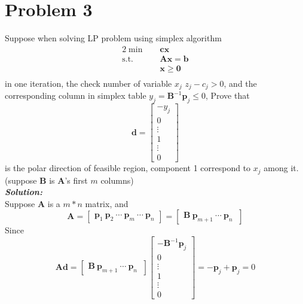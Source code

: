 \documentclass[paper=a4, fontsize=11pt]{scrartcl} %
\numberwithin{equation}{section} %
\numberwithin{figure}{section} %
\numberwithin{table}{section} %
\begin{document}
\section{Problem 3}
Suppose when solving LP problem using simplex algorithm
\begin{alignat}{2}  \nonumber
\min\quad & \mathbf{cx}\\    \nonumber
\mbox{s.t.}\quad   \nonumber
& \mathbf{Ax=b}\\           \nonumber
& \mathbf{x}\geq \mathbf{0}\\         \nonumber
\end{alignat}
in one iteration, the check number of variable $x_j$ $z_j-c_j>0$, and the corresponding column in simplex table $y_j=\mathbf{B}^{-1}\mathbf{p}_j\leq0$, Prove that
\begin{equation}  \nonumber
\mathbf{d} = \begin{bmatrix}
    -y_j \\  0 \\ \vdots \\ 1 \\ \vdots \\ 0
    \end{bmatrix}
\end{equation}
is  the polar direction of feasible region, component 1 correspond to $x_j$ among it. (suppose $\mathbf{B}$ is $\mathbf{A}$'s first $m$ columns)\\
\emph{\textbf{Solution:}}\\
Suppose $\mathbf{A}$ is a $m*n$ matrix, and
\begin{equation}  \nonumber
\mathbf{A} = \begin{bmatrix}\mathbf{p}_1 \ \mathbf{p}_2 \ \cdots \ \mathbf{p}_m \ \cdots \ \mathbf{p}_n \end{bmatrix}
= \begin{bmatrix}\mathbf{B}\ \mathbf{p}_{m+1} \ \cdots \ \mathbf{p}_n \ \end{bmatrix}
\end{equation}
Since
\begin{equation}  \nonumber
\mathbf{Ad} = \begin{bmatrix}\mathbf{B}\ \mathbf{p}_{m+1} \ \cdots \ \mathbf{p}_n \ \end{bmatrix}
\begin{bmatrix}-\mathbf{B}^{-1}\mathbf{p}_j \\ 0 \\ \vdots \\ 1 \\ \vdots \\ 0 \end{bmatrix} = -\mathbf{p}_j+\mathbf{p}_j = 0
\end{equation}
\end{document}
